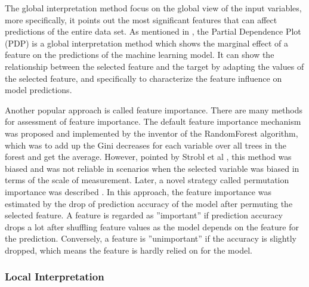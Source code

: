 The global interpretation method focus on the global view of the input variables, more specifically, it points out the most significant features that can affect predictions of the entire data set. As mentioned in \cite{friedman2001greedy}, the Partial Dependence Plot (PDP) is a global interpretation method which shows the marginal effect of a feature on the predictions of the machine learning model. It can show the relationship between the selected feature and the target by adapting the values of the selected feature, and specifically to characterize the feature influence on model predictions. 

Another popular approach is called feature importance. There are many methods for assessment of feature importance. The default feature importance mechanism was proposed and implemented by the inventor of the RandomForest algorithm, which was to add up the Gini decreases for each variable over all trees in the forest and get the average. However, pointed by Strobl et al \cite{strobl2007bias}, this method was biased and was not reliable in scenarios when the selected variable was biased in terms of the scale of measurement. Later, a novel strategy called permutation importance was described \cite{fisher2018model}. In this approach, the feature importance was estimated by the drop of prediction accuracy of the model after permuting the selected feature. A feature is regarded as ”important” if prediction accuracy drops a lot after shuffling feature values as the model depends on the feature for the prediction. Conversely, a feature is ”unimportant” if the accuracy is slightly dropped, which means the feature is hardly relied on for the model.

\subsubsection{Local Interpretation}

